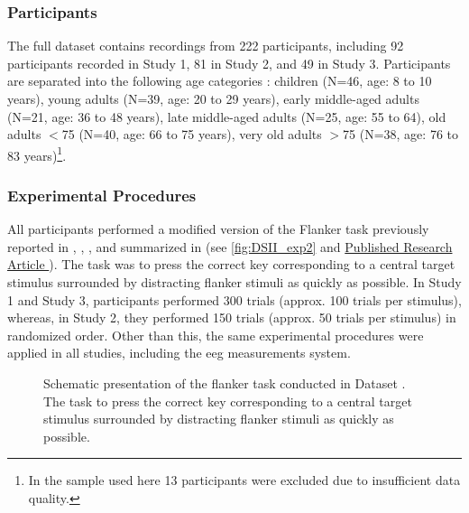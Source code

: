 \subsubsection{Participants}
\label{methods:datasets:II:participants}
The full dataset contains recordings from 222 participants, including 92 participants recorded in Study 1, 81 in Study 2, and 49 in Study 3. Participants are separated into the following age categories \cite{Reuter2019}: children (N=46, age: 8 to 10 years), young adults (N=39, age: 20 to 29 years), early middle-aged adults (N=21, age: 36 to 48 years), late middle-aged adults (N=25, age: 55 to 64), old adults $<$75 (N=40, age: 66 to 75 years), very old adults $>$75 (N=38, age: 76 to 83 years)\footnote{In the sample used here 13 participants were excluded due to insufficient data quality.}.

\subsubsection{Experimental Procedures}
\label{methods:datasets:II:experiment}
All participants performed a modified version of the Flanker task previously reported in \citeauthor{Reuter2017} \cite{Reuter2017}, \citeauthor{Winneke2012} \cite{Winneke2012}, \citeauthor{Winneke2019} \cite{Winneke2019}, and summarized in \citeauthor{Reuter2019} \cite{Reuter2019} (see \autoref{fig:DSII_exp2} and \hyperref[pub:paperII]{Published Research Article }). The task was to press the correct key corresponding to a central target stimulus surrounded by distracting flanker stimuli as quickly as possible. In Study 1 and Study 3, participants performed 300 trials (approx. 100 trials per stimulus), whereas, in Study 2, they performed 150 trials (approx. 50 trials per stimulus) in randomized order. Other than this, the same experimental procedures were applied in all studies, including the \gls{eeg} measurements system. 

\begin{figure}[h]
\begin{center}

\caption[Schematic presentation of the flanker task conducted in Dataset .]{Schematic presentation of the flanker task conducted in Dataset . The task to press the correct key corresponding to a central target stimulus surrounded by distracting flanker stimuli as quickly as possible.}
\label{fig:DSII_exp2}
\end{center}
\end{figure}

